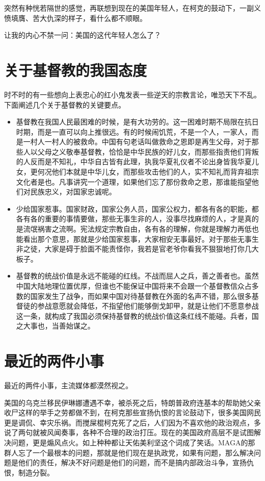 \documentclass[12pt,oneside]{book}
\begin{document}
突然有种恍若隔世的感觉，再联想到现在的美国年轻人，在柯克的鼓动下，一副义愤填膺、苦大仇深的样子，看什么都不顺眼。

让我的内心不禁一问：美国的这代年轻人怎么了？

\chapter{关于基督教的我国态度}
时不时的有一些想向上表忠心的红小鬼发表一些逆天的宗教言论，唯恐天下不乱。下面阐述几个关于基督教的关键要点。

\begin{itemize}
\item 基督教在我国人民最困难的时候，是有大功劳的。这一困难时期不局限在抗日时期，而是一直可以向上推很远。有的时候闹饥荒，不是一个人，一家人，而是一村人一村人的被救命。中国有句老话叫做救命之恩即是再生父母，对于那些人以父母之义敬奉基督教，恰恰是中华民族的好儿女，而那些指责他们背叛的人反而是不知礼，中华自古皆有此理，执我华夏礼仪者不论出身皆我华夏儿女，更何况他们本就是中华儿女，而那些攻击他们的人，实不知礼而背弃祖宗文化者是也。凡事讲究一个道理，如果他们忘了那份救命之恩，那谁能指望他们对民族忠义，对国家忠诚呢。
\item 少给国家惹事。国家财政，国家公务人员，国家公权力，都各有各的职能，都各有各的重要的事情要做，那些无事生非的人，没事尽找麻烦的人，才是真的是流氓祸害之流啊。宪法规定宗教自由，各有各的理解，你就是理解力再低也能看出那个意思，那就是少给国家惹事，大家相安无事最好。对于那些无事生非之徒，大家是碍于脸面不能责怪你，我若是官老爷你看我不狠狠地打你几大板子。
\item 基督教的统战价值是永远不能碰的红线。不战而屈人之兵，善之善者也。虽然中国大陆地理位置优厚，但谁也不能保证中国将来不会跟一个基督教信众占多数的国家发生了战争，而如果中国对待基督教在外面的名声不错，那么很多基督徒的参战意愿就会降低，不指望他们能够倒戈卸甲，就是让他们不愿意参战这一条，就构成了我国必须保持基督教的统战价值这条红线不能碰。兵者，国之大事也，当善始谋之。
\end{itemize}






\chapter{最近的两件小事}
最近的两件小事，主流媒体都漠然视之。

美国的乌克兰移民伊琳娜遭遇不幸，被杀死之后，特朗普政府连基本的帮助她父亲收尸这样的举手之劳都做不到，在柯克那些宣扬仇恨的言论鼓动下，很多美国网民更是调侃、幸灾乐祸。而搅屎棍柯克死了之后，人们因为不喜欢他的政治观点，多说了两句就被风闻奏事，各种不合理的政治打压。现在的美国政府高层不是试图解决问题，更是煽风点火。如上种种都让天佑美利坚这个词成了笑话。MAGA的那群人忘了一个最根本的问题，那就是他们现在是执政党，如果有问题，那么解决问题是他们的责任，解决不好问题是他们的问题，而不是搞内部政治斗争，宣扬仇恨，制造分裂。
\end{document}
